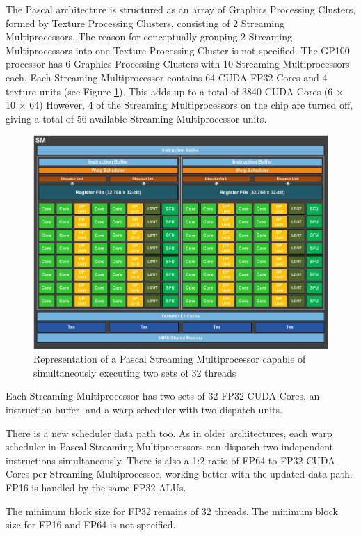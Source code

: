The Pascal architecture is structured as an array of Graphics Processing Clusters, formed by Texture Processing Clusters, consisting of 2 Streaming Multiprocessors.
The reason for conceptually grouping 2 Streaming Multiprocessors into one Texture Processing Cluster is not specified.
The GP100 processor has 6 Graphics Processing Clusters with 10 Streaming Multiprocessors each.
Each Streaming Multiprocessor contains 64 CUDA FP32 Cores and 4 texture units (see Figure \ref{fig:sm}).
This adds up to a total of 3840 CUDA Cores (6 $\times$ 10 $\times$ 64)
However, 4 of the Streaming Multiprocessors on the chip are turned off, giving a total of 56 available Streaming Multiprocessor units.

\begin{figure}[ht!]
    \centering
    \includegraphics[width=\linewidth]{gp100_sm}
    \caption{Representation of a Pascal Streaming Multiprocessor capable of simultaneously executing two sets of 32 threads}
    \label{fig:sm}
\end{figure}

Each Streaming Multiprocessor has two sets of 32 FP32 CUDA Cores, an instruction buffer, and a warp scheduler with two dispatch units.

There is a new scheduler data path too.
As in older architectures, each warp scheduler in Pascal Streaming Multiprocessors can dispatch two independent instructions simultaneously.
There is also a 1:2 ratio of FP64 to FP32 CUDA Cores per Streaming Multiprocessor, working better with the updated data path.
FP16 is handled by the same FP32 ALUs.

The minimum block size for FP32 remains of 32 threads.
The minimum block size for FP16 and FP64 is not specified.

